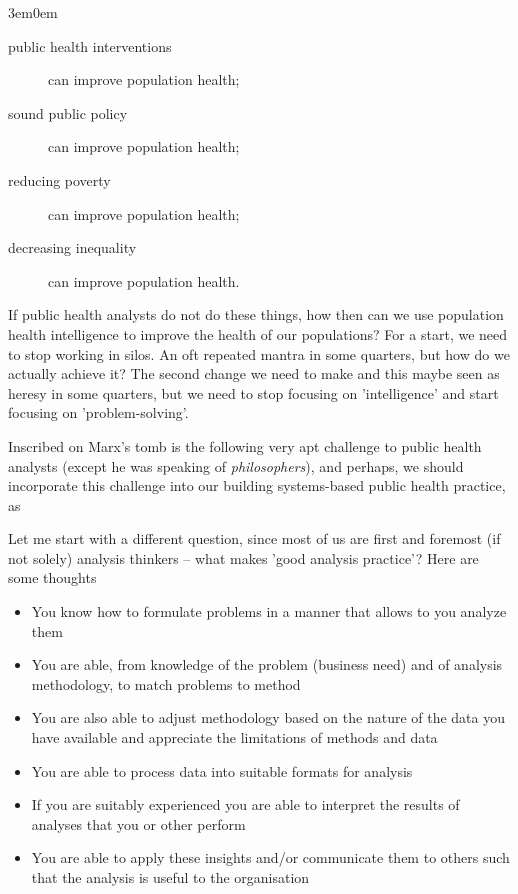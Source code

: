 \begin{adjustwidth}{3em}{0em}
	\begin{description}
		\item[public health interventions] can improve population health;
		\item[sound public policy] can improve population health;
		\item[reducing poverty] can improve population health;
		\item[decreasing inequality] can improve population health.
	\end{description}
\end{adjustwidth}

If public health analysts do not do these things, how then can we use population health intelligence to improve the health of our populations? For a start, we need to stop working in silos. An oft repeated mantra in some quarters, but how do we actually achieve it? The second change we need to make and this maybe seen as heresy in some quarters, but we need to stop focusing on 'intelligence' and start focusing on 'problem-solving'.

Inscribed on Marx's tomb is the following very apt challenge to public health analysts (except he was speaking of \emph{philosophers}), and perhaps, we should incorporate this challenge into our building systems-based public health practice, as



Let me start with a different question, since most of us are first and foremost (if not solely) analysis thinkers -- what makes 'good analysis practice'? Here are some thoughts
\begin{itemize}
	\item You know how to formulate problems in a manner that allows to you analyze them
	\item You are able, from knowledge of the problem (business need) and of analysis methodology, to match problems to method
	\item You are also able to adjust methodology based on the nature of the data you have available and appreciate the limitations of methods and data
	
	\item You are able to process data into suitable formats for analysis
	\item If you are suitably experienced you are able to interpret the results of analyses that you or other perform
	\item You are able to apply these insights and/or communicate them to others such that the analysis is useful to the organisation
\end{itemize}



